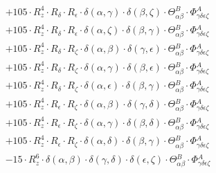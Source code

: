 \documentclass{article}
\begin{document}
\begin{equation}
\begin{array}{c}
 \\[0.2em] 		 + 105 \cdot R_{z}^{4} \cdot R_{\delta{}} \cdot R_{\epsilon{}} \cdot \delta{}\left(\alpha{}, \gamma{}\right) \cdot \delta{}\left(\beta{}, \zeta{}\right) \cdot \Theta{}^{B}_{\alpha{}\beta{}} \cdot \Phi{}^{A}_{\gamma{}\delta{}\epsilon{}\zeta{}} 
 \\[0.2em] 		 + 105 \cdot R_{z}^{4} \cdot R_{\delta{}} \cdot R_{\epsilon{}} \cdot \delta{}\left(\alpha{}, \zeta{}\right) \cdot \delta{}\left(\beta{}, \gamma{}\right) \cdot \Theta{}^{B}_{\alpha{}\beta{}} \cdot \Phi{}^{A}_{\gamma{}\delta{}\epsilon{}\zeta{}} 
 \\[0.2em] 		 + 105 \cdot R_{z}^{4} \cdot R_{\delta{}} \cdot R_{\zeta{}} \cdot \delta{}\left(\alpha{}, \beta{}\right) \cdot \delta{}\left(\gamma{}, \epsilon{}\right) \cdot \Theta{}^{B}_{\alpha{}\beta{}} \cdot \Phi{}^{A}_{\gamma{}\delta{}\epsilon{}\zeta{}} 
 \\[0.2em] 		 + 105 \cdot R_{z}^{4} \cdot R_{\delta{}} \cdot R_{\zeta{}} \cdot \delta{}\left(\alpha{}, \gamma{}\right) \cdot \delta{}\left(\beta{}, \epsilon{}\right) \cdot \Theta{}^{B}_{\alpha{}\beta{}} \cdot \Phi{}^{A}_{\gamma{}\delta{}\epsilon{}\zeta{}} 
 \\[0.2em] 		 + 105 \cdot R_{z}^{4} \cdot R_{\delta{}} \cdot R_{\zeta{}} \cdot \delta{}\left(\alpha{}, \epsilon{}\right) \cdot \delta{}\left(\beta{}, \gamma{}\right) \cdot \Theta{}^{B}_{\alpha{}\beta{}} \cdot \Phi{}^{A}_{\gamma{}\delta{}\epsilon{}\zeta{}} 
 \\[0.2em] 		 + 105 \cdot R_{z}^{4} \cdot R_{\epsilon{}} \cdot R_{\zeta{}} \cdot \delta{}\left(\alpha{}, \beta{}\right) \cdot \delta{}\left(\gamma{}, \delta{}\right) \cdot \Theta{}^{B}_{\alpha{}\beta{}} \cdot \Phi{}^{A}_{\gamma{}\delta{}\epsilon{}\zeta{}} 
 \\[0.2em] 		 + 105 \cdot R_{z}^{4} \cdot R_{\epsilon{}} \cdot R_{\zeta{}} \cdot \delta{}\left(\alpha{}, \gamma{}\right) \cdot \delta{}\left(\beta{}, \delta{}\right) \cdot \Theta{}^{B}_{\alpha{}\beta{}} \cdot \Phi{}^{A}_{\gamma{}\delta{}\epsilon{}\zeta{}} 
 \\[0.2em] 		 + 105 \cdot R_{z}^{4} \cdot R_{\epsilon{}} \cdot R_{\zeta{}} \cdot \delta{}\left(\alpha{}, \delta{}\right) \cdot \delta{}\left(\beta{}, \gamma{}\right) \cdot \Theta{}^{B}_{\alpha{}\beta{}} \cdot \Phi{}^{A}_{\gamma{}\delta{}\epsilon{}\zeta{}} 
 \\[0.2em] 		 - 15 \cdot R_{z}^{6} \cdot \delta{}\left(\alpha{}, \beta{}\right) \cdot \delta{}\left(\gamma{}, \delta{}\right) \cdot \delta{}\left(\epsilon{}, \zeta{}\right) \cdot \Theta{}^{B}_{\alpha{}\beta{}} \cdot \Phi{}^{A}_{\gamma{}\delta{}\epsilon{}\zeta{}} 

\end{array}
\end{equation}
\end{document}
